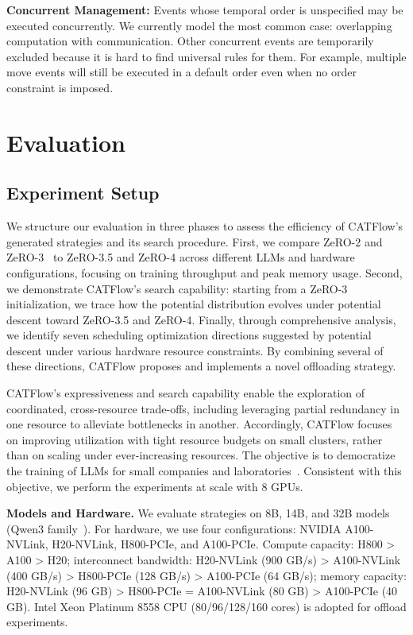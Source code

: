 \documentclass[letterpaper,twocolumn,10pt]{article}
\newcommand{\name}{CATFlow}
\begin{document}
\textbf{Concurrent Management:} Events whose temporal order is unspecified may be executed concurrently. We currently model the most common case: overlapping computation with communication. Other concurrent events are temporarily excluded because it is hard to find universal rules for them. For example, multiple move events will still be executed in a default order even when no order constraint is imposed.

\section{Evaluation}
\label{sec:exp}
\subsection{Experiment Setup}
\label{sec:exp_setting}

We structure our evaluation in three phases to assess the efficiency of \name{}'s generated strategies and its search procedure. First, we compare ZeRO-2 and ZeRO-3~\cite{rajbhandari2020zero} to ZeRO-3.5 and ZeRO-4 across different LLMs and hardware configurations, focusing on training throughput and peak memory usage. Second, we demonstrate \name{}'s search capability: starting from a ZeRO-3 initialization, we trace how the potential distribution evolves under potential descent toward ZeRO-3.5 and ZeRO-4. Finally, through comprehensive analysis, we identify seven scheduling optimization directions suggested by potential descent under various hardware resource constraints. By combining several of these directions, \name{} proposes and implements a novel offloading strategy. 

\name{}'s expressiveness and search capability enable the exploration of coordinated, cross-resource trade-offs, including leveraging partial redundancy in one resource to alleviate bottlenecks in another. Accordingly, \name{} focuses on improving utilization with tight resource budgets on small clusters, rather than on scaling under ever-increasing resources. The objective is to democratize the training of LLMs for small companies and laboratories~\cite{sun2025mepipe}. Consistent with this objective, we perform the experiments at scale with 8 GPUs.

\textbf{Models and Hardware.} We evaluate strategies on 8B, 14B, and 32B models (Qwen3 family~\cite{yang2025qwen3}). For hardware, we use four configurations: NVIDIA A100-NVLink, H20-NVLink, H800-PCIe, and A100-PCIe. Compute capacity: H800 > A100 > H20; interconnect bandwidth: H20-NVLink (900 GB/s) > A100-NVLink (400 GB/s) > H800-PCIe (128 GB/s) > A100-PCIe (64 GB/s); memory capacity: H20-NVLink (96 GB) > H800-PCIe = A100-NVLink (80 GB) > A100-PCIe (40 GB). Intel Xeon Platinum 8558 CPU (80/96/128/160 cores) is adopted for offload experiments.
\end{document}
